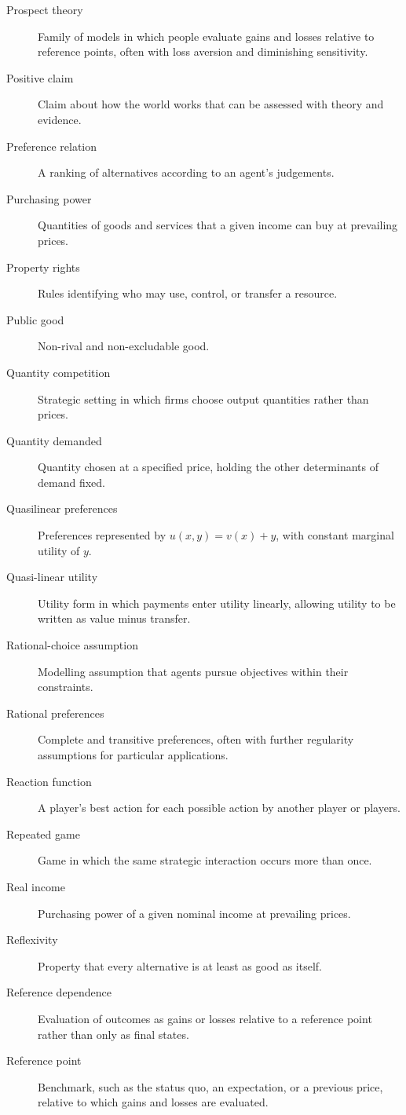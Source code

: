 \begin{description}
  \item[Prospect theory] Family of models in which people evaluate gains and losses relative to reference points, often with loss aversion and diminishing sensitivity.
  \item[Positive claim] Claim about how the world works that can be assessed with theory and evidence.
  \item[Preference relation] A ranking of alternatives according to an agent's judgements.
  \item[Purchasing power] Quantities of goods and services that a given income can buy at prevailing prices.
  \item[Property rights] Rules identifying who may use, control, or transfer a resource.
  \item[Public good] Non-rival and non-excludable good.
  \item[Quantity competition] Strategic setting in which firms choose output quantities rather than prices.
  \item[Quantity demanded] Quantity chosen at a specified price, holding the other determinants of demand fixed.
  \item[Quasilinear preferences] Preferences represented by $u(x,y)=v(x)+y$, with constant marginal utility of $y$.
  \item[Quasi-linear utility] Utility form in which payments enter utility linearly, allowing utility to be written as value minus transfer.
  \item[Rational-choice assumption] Modelling assumption that agents pursue objectives within their constraints.
  \item[Rational preferences] Complete and transitive preferences, often with further regularity assumptions for particular applications.
  \item[Reaction function] A player's best action for each possible action by another player or players.
  \item[Repeated game] Game in which the same strategic interaction occurs more than once.
  \item[Real income] Purchasing power of a given nominal income at prevailing prices.
  \item[Reflexivity] Property that every alternative is at least as good as itself.
  \item[Reference dependence] Evaluation of outcomes as gains or losses relative to a reference point rather than only as final states.
  \item[Reference point] Benchmark, such as the status quo, an expectation, or a previous price, relative to which gains and losses are evaluated.

\end{description}

